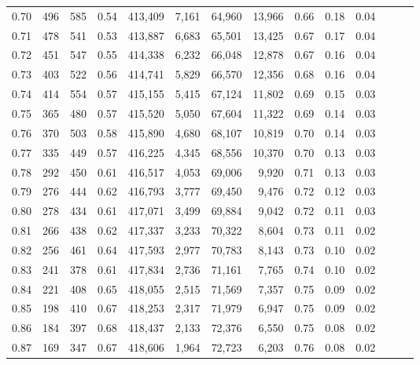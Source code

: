 \begin{tabular}{rrrrrrrrrrrrrr}
0.70 &     496 &    585 &  0.54 &  413,409 &    7,161 &  64,960 &  13,966 &  0.66 &  0.18 &      0.04 \\
0.71 &     478 &    541 &  0.53 &  413,887 &    6,683 &  65,501 &  13,425 &  0.67 &  0.17 &      0.04 \\
0.72 &     451 &    547 &  0.55 &  414,338 &    6,232 &  66,048 &  12,878 &  0.67 &  0.16 &      0.04 \\
0.73 &     403 &    522 &  0.56 &  414,741 &    5,829 &  66,570 &  12,356 &  0.68 &  0.16 &      0.04 \\
0.74 &     414 &    554 &  0.57 &  415,155 &    5,415 &  67,124 &  11,802 &  0.69 &  0.15 &      0.03 \\
0.75 &     365 &    480 &  0.57 &  415,520 &    5,050 &  67,604 &  11,322 &  0.69 &  0.14 &      0.03 \\
0.76 &     370 &    503 &  0.58 &  415,890 &    4,680 &  68,107 &  10,819 &  0.70 &  0.14 &      0.03 \\
0.77 &     335 &    449 &  0.57 &  416,225 &    4,345 &  68,556 &  10,370 &  0.70 &  0.13 &      0.03 \\
0.78 &     292 &    450 &  0.61 &  416,517 &    4,053 &  69,006 &   9,920 &  0.71 &  0.13 &      0.03 \\
0.79 &     276 &    444 &  0.62 &  416,793 &    3,777 &  69,450 &   9,476 &  0.72 &  0.12 &      0.03 \\
0.80 &     278 &    434 &  0.61 &  417,071 &    3,499 &  69,884 &   9,042 &  0.72 &  0.11 &      0.03 \\
0.81 &     266 &    438 &  0.62 &  417,337 &    3,233 &  70,322 &   8,604 &  0.73 &  0.11 &      0.02 \\
0.82 &     256 &    461 &  0.64 &  417,593 &    2,977 &  70,783 &   8,143 &  0.73 &  0.10 &      0.02 \\
0.83 &     241 &    378 &  0.61 &  417,834 &    2,736 &  71,161 &   7,765 &  0.74 &  0.10 &      0.02 \\
0.84 &     221 &    408 &  0.65 &  418,055 &    2,515 &  71,569 &   7,357 &  0.75 &  0.09 &      0.02 \\
0.85 &     198 &    410 &  0.67 &  418,253 &    2,317 &  71,979 &   6,947 &  0.75 &  0.09 &      0.02 \\
0.86 &     184 &    397 &  0.68 &  418,437 &    2,133 &  72,376 &   6,550 &  0.75 &  0.08 &      0.02 \\
0.87 &     169 &    347 &  0.67 &  418,606 &    1,964 &  72,723 &   6,203 &  0.76 &  0.08 &      0.02 \\

\end{tabular}
